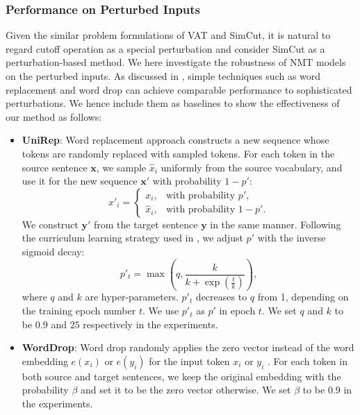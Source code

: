 \documentclass[11pt]{article}
\begin{document}
\subsubsection{Performance on Perturbed Inputs}

Given the similar problem formulations of VAT and SimCut, it is natural to regard cutoff operation as a special perturbation and consider SimCut as a perturbation-based method. We here investigate the robustness of NMT models on the perturbed inputs. As discussed in \citet{takase2021rethinking}, simple techniques such as word replacement and word drop can achieve comparable performance to sophisticated perturbations. We hence include them as baselines to show the effectiveness of our method as follows:

\begin{itemize}[leftmargin=*]

\item {\bf UniRep}: Word replacement approach constructs a new sequence whose tokens are randomly replaced with sampled tokens. For each token in the source sentence $\mathbf{x}$, we sample $\hat{x}_i$ uniformly from the source vocabulary, and use it for the new sequence $\mathbf{x}'$ with probability $1-p'$:
\begin{equation}
x'_{i} =
\begin{cases} 
x_i,  & \mbox{with probability }p', \\
\hat{x}_i, & \mbox{with probability }1 - p'.
\end{cases}
\end{equation}
We construct $\mathbf{y}'$ from the target sentence $\mathbf{y}$ in the same manner. Following the curriculum learning strategy used in \citet{bengio2015scheduled}, we adjust $p'$ with the inverse sigmoid decay:
\begin{equation}
p'_t = \max(q, \frac{k}{k+\exp{(\frac{t}{k})}}),
\end{equation}
where $q$ and $k$ are hyper-parameters. $p'_t$ decreases to $q$ from 1, depending on the training epoch number $t$. We use $p'_t$ as $p'$ in epoch $t$. We set $q$ and $k$ to be $0.9$ and $25$ respectively in the experiments.

\item {\bf WordDrop}: Word drop randomly applies the zero vector instead of the word embedding $e(x_i)$ or $e(y_i)$ for the input token $x_i$ or $y_i$ \cite{gal2016theoretically}. For each token in both source and target sentences, we keep the original embedding with the probability $\beta$ and set it to be the zero vector otherwise. We set $\beta$ to be $0.9$ in the experiments.



\end{itemize}
\end{document}

